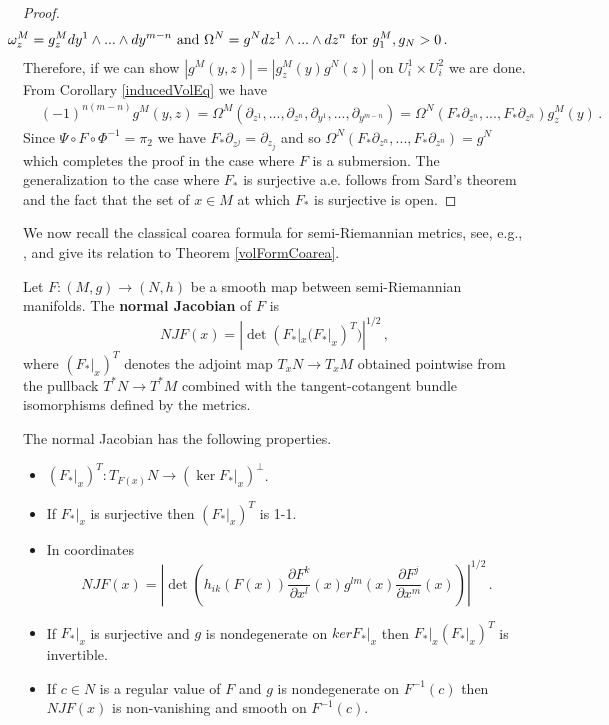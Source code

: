 \begin{proof}
\begin{align}
&\text{\hspace{-5cm}where \hspace{2cm}}\omega^M_z=g^M_z dy^1\wedge...\wedge dy^{m-n} \text{ and }\Omega^N=g^N dz^1\wedge...\wedge dz^n \text{ for } g_1^M,g_N>0\,.\notag
\end{align}
Therefore, if we can show $|g^M(y,z)|=|g_z^M(y)g^N(z)|$ on $U_i^1\times U_i^2$ we are done. From Corollary \ref{inducedVolEq} we have
\begin{align}
&(-1)^{n(m-n)} g^M(y,z)
=\Omega^M(\partial_{z^1},...,\partial_{z^n},\partial_{y^1},...,\partial_{y^{m-n}})=\Omega^N(F_*\partial_{z^n},...,F_*\partial_{z^n})g_z^M(y)\,.
\end{align}
Since $\Psi\circ F\circ\Phi^{-1}=\pi_2$ we have $F_*\partial_{z^j}=\partial_{z_j}$ and so $\Omega^N(F_*\partial_{z^n},...,F_*\partial_{z^n})=g^N$ which completes the proof in the case where $F$ is a submersion. The generalization to the case where $F_*$ is surjective a.e. follows from Sard's theorem and the fact that the set of $x\in M$ at which $F_*$ is surjective is open.
\end{proof}

We now recall the classical coarea formula for semi-Riemannian metrics, see, e.g., \cite{chavel1995riemannian}, and give its relation to Theorem \ref{volFormCoarea}.
\begin{definition}
Let $F:(M,g)\rightarrow (N,h)$ be a smooth map between semi-Riemannian manifolds. The {\bf normal Jacobian} of $F$ is
\begin{equation}
NJF(x)=|\det(F_*|_x(F_*|_x)^T)|^{1/2}\,,
\end{equation}
where $(F_*|_x)^T$ denotes the adjoint map $T_xN\rightarrow T_xM$ obtained pointwise from the pullback $T^*N\rightarrow T^*M$ combined with the tangent-cotangent bundle isomorphisms defined by the metrics.
\end{definition}

\begin{lemma}
The normal Jacobian has the following properties.
\begin{itemize}
\item $(F_*|_x)^T:T_{F(x)}N\rightarrow (\ker F_*|_x)^\perp$.
\item If $F_*|_x$ is surjective then $(F_*|_x)^T$ is 1-1.
\item In coordinates
\begin{equation}
NJF(x)=\left|\det\left(h_{ik}(F(x))\frac{\partial F^k}{\partial x^l}(x)g^{lm}(x)\frac{\partial F^j}{\partial x^m}(x)\right)\right|^{1/2}\,.
\end{equation}
\item If $F_*|_x$ is surjective and $g$ is nondegenerate on $ker F_*|_x$ then $F_*|_x(F_*|_x)^T$ is invertible.
\item If $c\in N$ is a regular value of $F$ and $g$ is nondegenerate on $F^{-1}(c)$ then $NJF(x)$ is non-vanishing and smooth on $F^{-1}(c)$.
\end{itemize}
\end{lemma}

